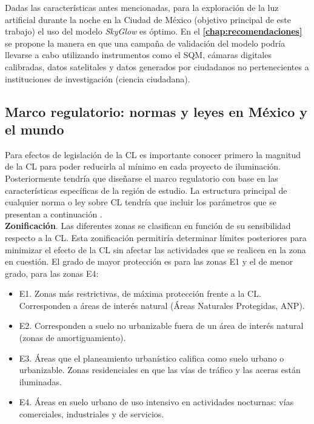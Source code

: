 Dadas las características antes mencionadas, para la exploración de la luz artificial durante la noche en la Ciudad de México (objetivo principal de este trabajo) el uso del modelo \textit{SkyGlow} es óptimo. En el  \textbf{\autoref{chap:recomendaciones}} se propone la manera en que una campaña de validación del modelo podría llevarse a cabo utilizando instrumentos como el SQM, cámaras digitales calibradas, datos satelitales y datos generados por ciudadanos no pertenecientes a instituciones de investigación (ciencia ciudadana).\\

\newpage

\subsection{Marco regulatorio: normas y leyes en México y el mundo}
\label{subsec:marcoregulatorio}

Para efectos de legislación de la CL es importante conocer primero la magnitud de la CL para poder reducirla al mínimo en cada proyecto de iluminación. Posteriormente tendría que diseñarse el marco regulatorio con base en las características específicas de la región de estudio. La estructura principal de cualquier norma o ley sobre CL tendría que incluir los parámetros que se presentan a continuación \citep{LibroCL}.\\


\textbf{Zonificación}.
Las diferentes zonas se clasifican en función de su sensibilidad respecto a la CL. Esta zonificación permitiría determinar límites posteriores para minimizar el efecto de la CL sin afectar las actividades que se realicen en la zona en cuestión. El grado de mayor protección es para las zonas E1 y el de menor grado, para las zonas E4:

\begin{itemize}

    \item E1. Zonas más restrictivas, de máxima protección frente a la CL. Corresponden a áreas de interés natural (Áreas Naturales Protegidas, ANP).
    
    \item E2. Corresponden a suelo no urbanizable fuera de un área de interés natural (zonas de amortiguamiento).
    
    \item E3. Áreas que el planeamiento urbanístico califica como suelo urbano o urbanizable. Zonas residenciales en que las vías de tráfico y las aceras están iluminadas.
    
    \item E4. Áreas en suelo urbano de uso intensivo en actividades nocturnas: vías comerciales, industriales y de servicios.
     
\end{itemize}


